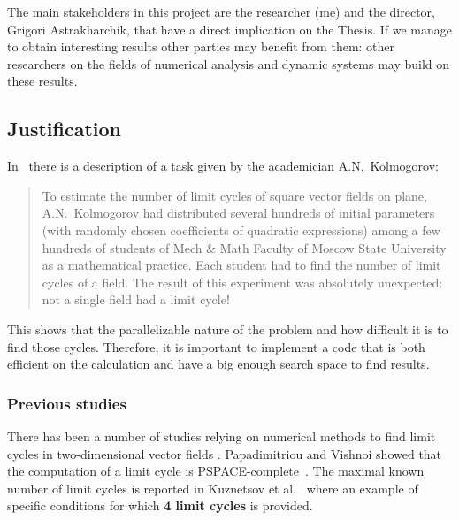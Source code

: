 The main stakeholders in this project are the researcher (me) and the director,
Grigori Astrakharchik, that have a direct implication on the Thesis. If we manage
to obtain interesting results other parties may benefit from them: other
researchers on the fields of numerical analysis and dynamic systems may build on
these results.

\pagebreak
\subsection{Justification}

In~\cite{kuznetsov_visualization_2013} there is a description of a task given by
the academician A.N.~Kolmogorov:

\begin{quote}
To estimate the number of limit cycles of square vector fields on plane, A.N.~Kolmogorov had distributed several hundreds of initial parameters (with randomly chosen coefficients of quadratic expressions) among a few hundreds of students of Mech \& Math Faculty of Moscow State University as a mathematical practice. Each student had to find the number of limit cycles of a field. The result of this experiment was absolutely unexpected: not a single field had a limit cycle!
\end{quote}

This shows that the parallelizable nature of the problem and how difficult it is to find those cycles. Therefore, it is important to implement a code that is both efficient on the calculation and have a big enough search space to find results.

\subsubsection{Previous studies}

There has been a number of studies relying on numerical methods to find limit cycles in two-dimensional vector fields
\cite{leonov_hidden_2013,van_der_hoff_numerical_2013,casades_computation_2013,gasull_effective_2015}.
Papadimitriou and Vishnoi showed that the computation of a limit cycle is
PSPACE-complete~\cite{papadimitriou_computational_2015}.
The maximal known number of limit cycles is reported in Kuznetsov et al.~\cite{kuznetsov_visualization_2013} where an example of specific conditions for which \textbf{4 limit cycles} is provided.

